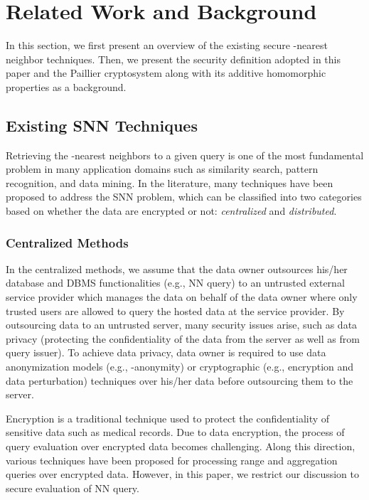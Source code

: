 \documentclass{article}
\begin{document}
\section{Related Work and Background}\label{sec:related-work}

In this section, we first present an overview of the existing secure -nearest neighbor techniques. Then, we present 
the security definition adopted in this paper and the Paillier cryptosystem along with its additive 
homomorphic properties as a background. 
\subsection{Existing SNN Techniques}
Retrieving the  -nearest neighbors to a given query  is one of the most 
fundamental problem in many application domains such as similarity search, 
pattern recognition, and data mining. In the literature, many techniques 
have been proposed to address the SNN problem, which can be classified into 
two categories based on whether the data are encrypted or not: \textit{centralized} and \textit{distributed}.
\subsubsection{Centralized Methods}
In the centralized methods, we assume that the data owner outsources his/her database and DBMS 
functionalities (e.g., NN query) to an untrusted external service provider which 
manages the data on behalf of the data owner where only trusted users 
are allowed to query the hosted data at the service provider. 
By outsourcing data to an untrusted server, many security issues arise, 
such as data privacy (protecting the confidentiality of the data from 
the server as well as from query issuer). 
To achieve data privacy, data owner is required to use data anonymization models 
(e.g., -anonymity) or cryptographic (e.g., encryption and data perturbation) techniques 
over his/her data before outsourcing them to the server.


Encryption is a traditional technique used to protect the confidentiality 
of sensitive data such as medical records. Due to data encryption, the process of 
query evaluation over encrypted data becomes challenging. 
Along this direction, various techniques have been proposed for processing range \cite{agrawal2004order,hore2004privacy,shi2007multi, hore2012secure} 
and aggregation queries \cite{hacigumucs2004efficient,mykletun2006aggregation} over encrypted data. 
However, in this paper, 
we restrict our discussion to secure evaluation of NN query.
\end{document}
